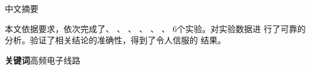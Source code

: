 \documentclass[twoside, openright]{report}
\numberwithin{Exercise}{chapter}
\numberwithin{Answer}{chapter}
\begin{document}

\pagestyle{fancy}
\renewcommand{\headrulewidth}{0pt}
\fancyhead[LC, RC]{}
\fancyhead[LE, RO]{}
\fancyhead[RE, LO]{}
\fancyfoot[LC, RC]{}
\fancyfoot[LE, RO]{}
\fancyfoot[RE, LO]{}


\newpage

\begin{center}
	\renewcommand{\CJKglue}{\hskip 2pt}\heiti \Title 中文摘要

	\vspace{0.3em}

	\begin{boxedminipage}[][18cm]{\linewidth}
		\begin{spacing}{1.5}

			\vspace{1\ccwd}

			本文依据要求，依次完成了、
			、
			、
			、
			、
			、
			6个实验。对实验数据进
			行了可靠的分析。验证了相关结论的准确性，得到了令人信服的
			结果。
			\cite{2000高频电子线路原理, 李国平2006谈谈高频电子线路教学, 2001高频电子线路实验与课程设计}

			\vspace{2\ccwd}

			\noindent\textbf{关键词}\hspace{1\ccwd}高频电子线路

		\end{spacing}
	\end{boxedminipage}
\end{center}


\newpage
\end{document}
